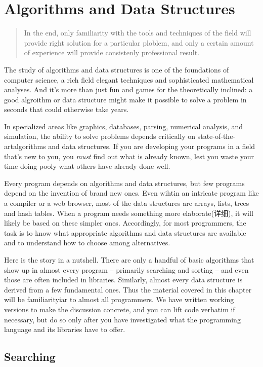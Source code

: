 \chapter{Algorithms and Data Structures}
\label{chap:alds}
\begin{quote}
    In the end, only familiarity with the tools and techniques of the field
    will provide right solution for a particular ploblem, and only a
    certain amount of experience will provide consistenly professional
    result.
\end{quote}
\begin{quotesrc}
    Raymond Fielding.
    Cinematography}
\end{quotesrc}
The study of algorithms and data structures is one of the foundations of
computer science, a rich field elegant techniques and sophisticated
mathematical analyses. And it's more than just fun and games for the
theoretically inclined: a good algroithm or data structure might make it
possible to solve a problem in seconds that could otherwise take years.

In specialized areas like graphics, databases, parsing, numerical analysis,
and simulation, the ability to solve problems depends critically on
state-of-the-artalgorithms and data structures. If you are developing your
programs in a field that's new to you, you \textit{must} find out what is
already known, lest you waste your time doing pooly what others have already
 done well.

Every program depends on algorithms and data structures, but few programs
depend on the invention of brand new ones. Even wihtin an intricate program
like a compiler or a web browser, most of the data structures are arrays,
lists, trees and hash tables. When a program needs something more
elaborate(详细), it will likely be based on these simpler ones.
Accordingly, for most programmers, the task is to know what appropriate
algorithms and data structures are available and to understand how to
choose among alternatives.

Here is the story in a nutshell. There are only a handful of basic
algorithms that show up in almost every program -- primarily searching and
sorting -- and even those are often included in libraries. Similarly,
almost every data structure is derived from a few fundamental ones. Thus
the material covered in this chapter will be familiarityiar to almost all
programmers. We have written working versions to make the discussion
concrete, and you can lift code verbatim if necessary, but do so only after
you have investigated what the programming language and its libraries have
to offer.

\section{Searching}

